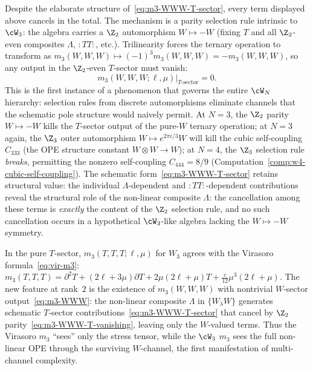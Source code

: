 Despite the elaborate structure of~\eqref{eq:m3-WWW-T-sector},
every term displayed above cancels in the total.
The mechanism is a parity selection rule intrinsic to $\cW_3$:
the algebra carries a $\Z_2$ automorphism $W \mapsto -W$
(fixing $T$ and all $\Z_2$-even composites $\Lambda$, ${:}TT{:}$,
etc.). Trilinearity forces the ternary operation to transform as
$m_3(W,W,W) \mapsto (-1)^3 m_3(W,W,W) = -m_3(W,W,W)$,
so any output in the $\Z_2$-even $T$-sector must vanish:
\begin{equation}
\label{eq:m3-WWW-T-vanishing}
m_3(W,W,W;\ell,\mu)\big|_{T\text{-sector}} = 0.
\end{equation}
This is the first instance of a phenomenon that governs the
entire $\cW_N$ hierarchy: selection rules from discrete
automorphisms eliminate channels that the schematic pole
structure would naively permit. At $N = 3$, the $\Z_2$ parity
$W \mapsto -W$ kills the $T$-sector output of the pure-$W$
ternary operation; at $N = 3$ again, the $\Z_3$ outer automorphism
$W \mapsto e^{2\pi i/3}W$ will kill the cubic self-coupling
$C_{333}$ (the OPE structure constant $W \otimes W \to W$);
at $N = 4$, the $\Z_3$ selection rule \emph{breaks}, permitting
the nonzero self-coupling $C_{444} = 8/9$
(Computation~\ref{comp:w4-cubic-self-coupling}).
The schematic form~\eqref{eq:m3-WWW-T-sector} retains structural value:
the individual $\Lambda$-dependent and
${:}TT{:}$-dependent contributions reveal the structural role
of the non-linear composite $\Lambda$: the cancellation among
these terms is \emph{exactly} the content of the $\Z_2$
selection rule, and no such cancellation occurs in a
hypothetical $\cW_3$-like algebra lacking the $W \mapsto -W$
symmetry.

\begin{remark}
\label{rem:m3-comparison}
In the pure $T$-sector, $m_3(T,T,T;\ell,\mu)$ for $W_3$ agrees
with the Virasoro formula~\eqref{eq:vir-m3}:
$m_3(T,T,T) = \partial^2 T + (2\ell + 3\mu)\partial T
+ 2\mu(2\ell + \mu)T + \frac{c}{12}\mu^3(2\ell + \mu)$.
The new feature at rank~$2$ is the existence of $m_3(W,W,W)$
with nontrivial $W$-sector output~\eqref{eq:m3-WWW}:
the non-linear composite $\Lambda$ in $\{W_\lambda W\}$
generates schematic $T$-sector contributions~\eqref{eq:m3-WWW-T-sector}
that cancel by $\Z_2$ parity~\eqref{eq:m3-WWW-T-vanishing},
leaving only the $W$-valued terms. Thus the Virasoro
$m_3$ ``sees'' only the stress tensor, while the $\cW_3$
$m_3$ sees the full non-linear OPE through the surviving
$W$-channel, the first manifestation of multi-channel
complexity.
\end{remark}

